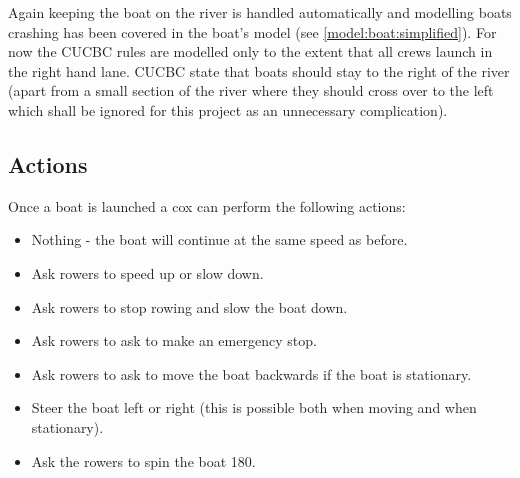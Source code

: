       Again keeping the boat on the river is handled automatically and modelling boats crashing has been covered in the boat's model (see \ref{model:boat:simplified}). For now the CUCBC rules are modelled only to the extent that all crews launch in the right hand lane. CUCBC state that boats should stay to the right of the river (apart from a small section of the river where they should cross over to the left which shall be ignored for this project as an unnecessary complication).

      \subsection{Actions} \label{model:cox:actions}
      Once a boat is launched a cox can perform the following actions:
      \begin{itemize}
        \item Nothing - the boat will continue at the same speed as before.
        \item Ask rowers to speed up or slow down.
        \item Ask rowers to stop rowing and slow the boat down.
        \item Ask rowers to ask to make an emergency stop.
        \item Ask rowers to ask to move the boat backwards if the boat is stationary.
        \item Steer the boat left or right (this is possible both when moving and when stationary).
        \item Ask the rowers to spin the boat 180\textdegree.
      \end{itemize}
        
